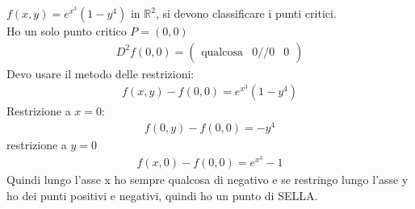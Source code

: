 \documentclass[a4paper, oneside]{article}
\begin{document}
        \begin{example}
            $f(x,y) = e^{x^3}(1-y^4)$ in $\mathbb{R}^2$, si devono classificare i punti critici.\\
            Ho un solo punto critico $P = (0,0)$
            \begin{gather*}
                D^2f(0,0) = \begin{pmatrix}
                    \text{qualcosa} & 0 //
                    0 & 0
                \end{pmatrix}
            \end{gather*}
            Devo usare il metodo delle restrizioni:
            \begin{gather*}
                f(x,y) - f(0,0) = e^{x^3}(1-y^4)
            \end{gather*}
            Restrizione a $x=0$:
            \begin{gather*}
                f(0,y) - f(0,0) = -y^4
            \end{gather*}
            restrizione a $y=0$
            \begin{gather*}
                f(x,0)- f(0,0) = e^{x^3}-1
            \end{gather*}
            Quindi lungo l'asse x ho sempre qualcosa di negativo e se restringo lungo l'asse y ho dei punti positivi e negativi, quindi ho un punto di SELLA.
        \end{example}
\end{document}
